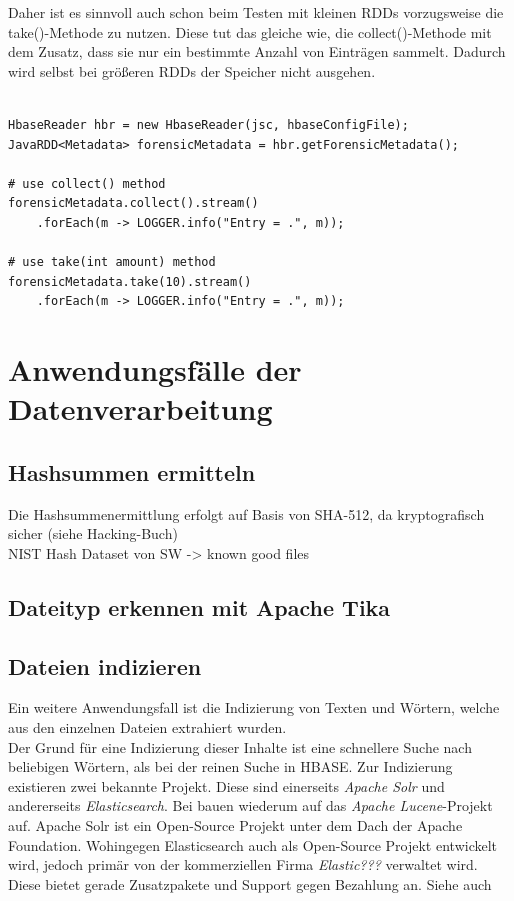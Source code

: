 \noindent
Daher ist es sinnvoll auch schon beim Testen mit kleinen RDDs vorzugsweise die take()-Methode zu nutzen. Diese tut das gleiche wie, die collect()-Methode mit dem Zusatz, dass sie nur ein bestimmte Anzahl von Einträgen sammelt. Dadurch wird selbst bei größeren RDDs der Speicher nicht ausgehen. 


\begin{lstlisting}[label={lst:spark_rdd_collect},caption= Spark Java RDD collect()-Methode ,captionpos=b,frame=single,style=customshell]

HbaseReader hbr = new HbaseReader(jsc, hbaseConfigFile);
JavaRDD<Metadata> forensicMetadata = hbr.getForensicMetadata();

# use collect() method
forensicMetadata.collect().stream()
	.forEach(m -> LOGGER.info("Entry = .", m));

# use take(int amount) method	
forensicMetadata.take(10).stream()
	.forEach(m -> LOGGER.info("Entry = .", m));	
\end{lstlisting}


\section{Anwendungsfälle der Datenverarbeitung}
\subsection{Hashsummen ermitteln}
Die Hashsummenermittlung erfolgt auf Basis von SHA-512, da kryptografisch sicher (siehe Hacking-Buch)\\

\noindent
NIST Hash Dataset von SW -> known good files\cite[S. 36]{digital_forensics}
\subsection{Dateityp erkennen mit Apache Tika}

\subsection{Dateien indizieren}
Ein weitere Anwendungsfall ist die Indizierung von Texten und Wörtern, welche aus den einzelnen Dateien extrahiert wurden.\\

\noindent
Der Grund für eine Indizierung dieser Inhalte ist eine schnellere Suche nach beliebigen Wörtern, als bei der reinen Suche in HBASE. Zur Indizierung existieren zwei bekannte Projekt. Diese sind einerseits \textit{Apache Solr} und andererseits \textit{Elasticsearch}. Bei bauen wiederum auf das \textit{Apache Lucene}-Projekt auf. Apache Solr ist ein Open-Source Projekt unter dem Dach der Apache Foundation. Wohingegen Elasticsearch auch als Open-Source Projekt entwickelt wird, jedoch primär von der kommerziellen Firma \textit{Elastic???} verwaltet wird. Diese bietet gerade Zusatzpakete und Support gegen Bezahlung an.
Siehe auch \cite[S.7]{solr_search}
